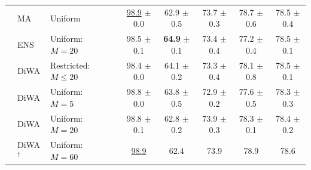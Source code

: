 \begin{table}[h]
{\begin{tabular}{llll|ccccc}
             & MA \cite{arpit2021ensemble}                        & Uniform                   &                                                & \underline{98.9} $\pm$ 0.0 & 62.9 $\pm$ 0.5          & 73.7 $\pm$ 0.3             & 78.7 $\pm$ 0.6             & 78.5 $\pm$ 0.4             \\
             & ENS                                                & Uniform: $M=20$           &                                                & 98.5 $\pm$ 0.1             & \textbf{64.9} $\pm$ 0.1 & 73.4 $\pm$ 0.4             & 77.2 $\pm$ 0.4             & 78.5 $\pm$ 0.1             \\
             & DiWA                                               & Restricted: $M \leq 20$   &                                                & 98.4 $\pm$ 0.0             & 64.1 $\pm$ 0.2          & 73.3 $\pm$ 0.4             & 78.1 $\pm$ 0.8             & 78.5 $\pm$ 0.1             \\
             & DiWA                                               & Uniform: $M=5$            &                                                & 98.8 $\pm$ 0.0             & 63.8 $\pm$ 0.5          & 72.9 $\pm$ 0.2             & 77.6 $\pm$ 0.5             & 78.3 $\pm$ 0.3             \\
             & DiWA                                               & Uniform: $M=20$           &                                                & 98.8 $\pm$ 0.1             & 62.8 $\pm$ 0.2          & 73.9 $\pm$ 0.3             & 78.3 $\pm$ 0.1             & 78.4 $\pm$ 0.2             \\
             & DiWA$^{\dagger}$                                   & Uniform: $M=60$           &                                                & \underline{98.9}           & 62.4                    & 73.9                       & 78.9                       & 78.6                       \\
            \bottomrule
        \end{tabular}}
\end{table}





